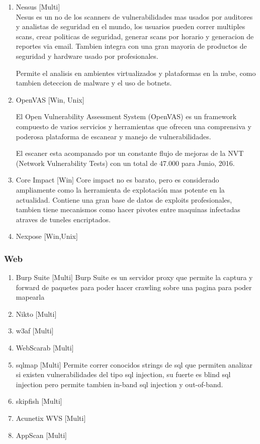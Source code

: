 \begin{enumerate}
\item{Nessus [Multi]} \\
Nesus es un no de los scanners de vulnerabilidades mas usados por auditores y analistas de seguridad en el mundo, los usuarios pueden correr multiples scans, crear politicas de seguridad, generar scans por horario y generacion de reportes via email. Tambien integra con una gran mayoria de productos de seguridad y hardware usado por profesionales. 

Permite el analisis en ambientes virtualizados y plataformas en la nube, como tambien deteccion de malware y el uso de botnets.

\item{OpenVAS [Win, Unix]}

El Open Vulnerability Assessment System (OpenVAS) es un framework compuesto de varios servicios y herramientas que ofrecen una comprensiva y poderosa plataforma de escanear y manejo de vulnerabilidades.

El escaner esta acompanado por un constante flujo de mejoras de la NVT (Network Vulnerability Tests) con un total de 47.000 para Junio, 2016.

\item{Core Impact [Win]}
Core impact no es barato, pero es considerado ampliamente como la herramienta de explotación mas potente en la actualidad. Contiene una gran base de datos de exploits profesionales, tambien tiene mecanismos como hacer pivotes entre maquinas infectadas atraves de tuneles encriptados. 

\item{Nexpose [Win,Unix]}


\end{enumerate}

\subsubsection{Web}

\begin{enumerate}
\item{Burp Suite [Multi]}
Burp Suite es un servidor proxy que permite la captura y forward de paquetes para poder hacer crawling sobre una pagina para poder mapearla 
\item{Nikto [Multi]}
\item{w3af [Multi]}
\item{WebScarab [Multi]}
\item{sqlmap [Multi]}
Permite correr conocidos strings de sql que permiten analizar si existen vulnerabilidades del tipo sql injection, su fuerte es blind sql injection pero permite tambien in-band sql injection y out-of-band.
\item{skipfish [Multi]}
\item{Acunetix WVS [Multi]}
\item{AppScan [Multi]}

\end{enumerate}

